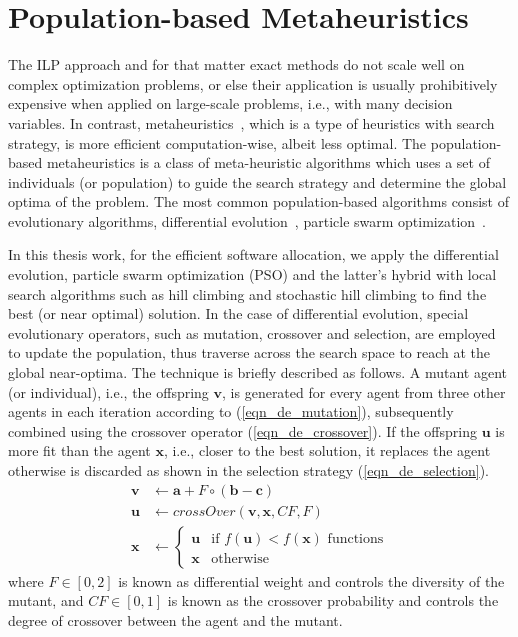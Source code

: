 \section{Population-based Metaheuristics}
The ILP approach and for that matter exact methods do not scale well on complex optimization problems, or else their application is usually prohibitively expensive when applied on large-scale problems, i.e., with many decision variables. In contrast, metaheuristics~\cite{2006HandbookMetaheuristics}\cite{Gonzalez2007HandbookMetaheuristics}, which is a type of heuristics with search strategy, is more efficient computation-wise, albeit less optimal. The population-based metaheuristics is a class of meta-heuristic algorithms which uses a set of individuals (or population) to guide the search strategy and determine the global optima of the problem. The most common population-based algorithms consist of evolutionary algorithms, differential evolution~\cite{Storn1997DifferentialSpaces}\cite{Das2016RecentSurvey}, particle swarm optimization~\cite{Poli2008AnApplications}\cite{Mirjalili2019ParticleOptimisation}.

In this thesis work, for the efficient software allocation, we apply the differential evolution, particle swarm optimization (PSO) and the latter's hybrid with local search algorithms such as hill climbing and stochastic hill climbing to find the best (or near optimal) solution. In the case of differential evolution, special evolutionary operators, such as mutation, crossover and selection, are employed to update the population, thus traverse across the search space to reach at the global near-optima. The technique is briefly described as follows. A mutant agent (or individual), i.e., the offspring $\textbf{v}$, is generated for every agent from three other agents in each iteration according to (\ref{eqn_de_mutation}), subsequently combined using the crossover operator (\ref{eqn_de_crossover}). If the offspring $\textbf{u}$ is more fit than the agent $\textbf{x}$, i.e., closer to the best solution, it replaces the agent otherwise is discarded as shown in the selection strategy (\ref{eqn_de_selection}).
\begin{align}
\label{eqn_de_mutation}
\textbf{v} & \leftarrow   \textbf{a} + F\circ(\textbf{b}-\textbf{c})\\
\label{eqn_de_crossover}
\textbf{u}&\leftarrow crossOver(\textbf{v},\textbf{x},CF,F)\\
\label{eqn_de_selection}
\textbf{x} &\leftarrow 
\begin{cases}
	\textbf{u} & \mbox{if } f(\textbf{u}) < f(\textbf{x})\mbox{ functions}\\
	\textbf{x} & \mbox{otherwise }
\end{cases}
\end{align}
where $F\in[0,2]$ is known as differential weight and controls the diversity of the mutant, and $CF\in[0,1]$ is known as the crossover probability and controls the degree of crossover between the agent and the mutant.

